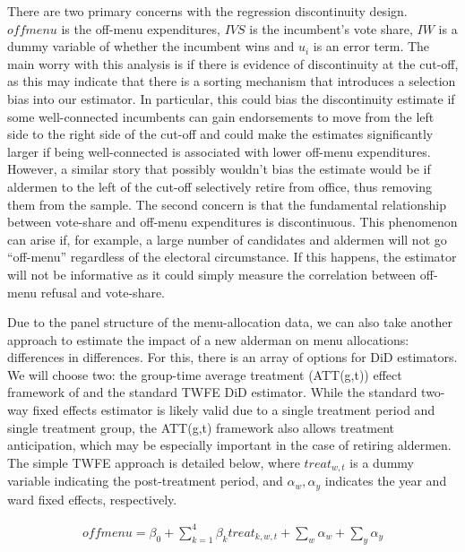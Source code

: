  There are two primary concerns with the regression discontinuity design. 
 $offmenu$ is the off-menu expenditures, $IVS$ is the incumbent's vote share, $IW$ is a dummy variable of whether the incumbent wins and $u_i$ is an error term. 
 The main worry with this analysis is if there is evidence of discontinuity at the cut-off, as this may indicate that there is a sorting mechanism that introduces a selection bias into our estimator. 
 In particular, this could bias the discontinuity estimate if some well-connected incumbents can gain endorsements to move from the left side to the right side of the cut-off and could make the estimates significantly larger if being well-connected is associated with lower off-menu expenditures. 
 However, a similar story that possibly wouldn't bias the estimate would be if aldermen to the left of the cut-off selectively retire from office, thus removing them from the sample. 
 The second concern is that the fundamental relationship between vote-share and off-menu expenditures is discontinuous. 
 This phenomenon can arise if, for example, a large number of candidates and aldermen will not go ``off-menu'' regardless of the electoral circumstance. 
 If this happens, the estimator will not be informative as it could simply measure the correlation between off-menu refusal and vote-share.


Due to the panel structure of the menu-allocation data, we can also take another approach to estimate the impact of a new alderman on menu allocations: differences in differences. 
For this, there is an array of options for DiD estimators. 
We will choose two: the group-time average treatment (ATT(g,t)) effect framework of \cite{CALLAWAY2021200} and the standard TWFE DiD estimator. 
While the standard two-way fixed effects estimator is likely valid due to a single treatment period and single treatment group, the ATT(g,t) framework also allows treatment anticipation, which may be especially important in the case of retiring aldermen. 
The simple TWFE approach is detailed below, where $treat_{w,t}$ is a dummy variable indicating the post-treatment period, and $\alpha_w, \alpha_y$ indicates the year and ward fixed effects, respectively. 

\begin{align*}
    offmenu=\beta_0 + \sum_{k=1}^4 \beta_k treat_{k,w,t} + \sum_w \alpha_w + \sum_y \alpha_y
\end{align*}

